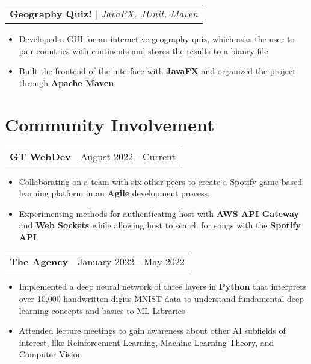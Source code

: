 \documentclass[letterpaper,11pt]{article}
\makeatletter
\newcommand{\resumeExperienceHeading}[2]{
    \begin{tabular*}{0.99\textwidth}[t]{l@{\extracolsep{\fill}}r}
      \textbf{#1} & #2 \\
    \end{tabular*}\vspace{-4pt}
}
\newcommand{\resumeProjectHeading}[2]{
    \begin{tabular*}{0.97\textwidth}[t]{l@{\extracolsep{\fill}}}
      \textbf{#1} $\vert$ \textit{#2} 
    \end{tabular*}\vspace{-4pt}
}
\newcommand{\resumeItemListStart}{\begin{itemize}[noitemsep]\vspace{-4pt}}
\newcommand{\resumeItemListEnd}{\end{itemize}}
\makeatother
\begin{document}
    \resumeProjectHeading{Geography Quiz!}{JavaFX, JUnit, Maven}
      \resumeItemListStart
        \item {Developed a GUI for an interactive geography quiz, which asks the user to pair countries with continents and stores the results to a bianry file.}
        \item {Built the frontend of the interface with \textbf{JavaFX} and organized the project through \textbf{Apache Maven}.}
      \resumeItemListEnd

\section{Community Involvement}
\resumeExperienceHeading{GT WebDev}{August 2022 - Current}
  \resumeItemListStart
    \item {Collaborating on a team with six other peers to create a Spotify game-based learning platform in an \textbf{Agile} development process.}
    \item {Experimenting methods for authenticating host with \textbf{AWS API Gateway} and \textbf{Web Sockets} while allowing host to search for songs with the \textbf{Spotify API}.}
  \resumeItemListEnd

\resumeExperienceHeading{The Agency}{January 2022 - May 2022}
  \resumeItemListStart
    \item {Implemented a deep neural network of three layers in \textbf{Python} that interprets over 10,000 handwritten digits MNIST data to understand fundamental deep learning concepts and basics to ML Libraries}
    \item {Attended lecture meetings to gain awareness about other AI subfields of interest, like Reinforcement
    Learning, Machine Learning Theory, and Computer Vision}
  \resumeItemListEnd
\end{document}
